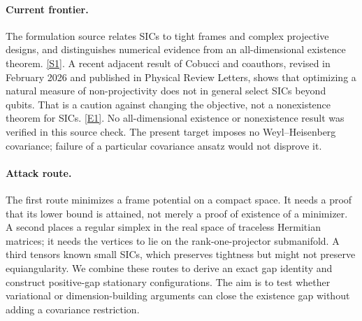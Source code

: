 \documentclass[11pt,a4paper]{article}
\newcommand{\sref}[2]{\hyperlink{source:#1:#2}{[S#2]}}
\newcommand{\eref}[2]{\hyperlink{extra:#1:#2}{[E#2]}}
\numberwithin{equation}{section}
\begin{document}
\paragraph{Current frontier.}
The formulation source relates SICs to tight frames and complex
projective designs, and distinguishes numerical evidence from an
all-dimensional existence theorem. \sref{1305}{1}.
A recent adjacent result of Cobucci and coauthors, revised in February
2026 and published in Physical Review Letters, shows that optimizing a
natural measure of non-projectivity does not in general select SICs
beyond qubits. That is a caution against changing the objective, not a
nonexistence theorem for SICs. \eref{1305}{1}.
No all-dimensional existence or nonexistence result was verified in this
source check. The present target imposes no Weyl--Heisenberg covariance;
failure of a particular covariance ansatz would not disprove it.

\paragraph{Attack route.}
The first route minimizes a frame potential on a compact space. It needs
a proof that its lower bound is attained, not merely a proof of existence
of a minimizer. A second places a regular simplex in the real space of
traceless Hermitian matrices; it needs the vertices to lie on the
rank-one-projector submanifold. A third tensors known small SICs, which
preserves tightness but might not preserve equiangularity. We combine
these routes to derive an exact gap identity and construct positive-gap
stationary configurations. The aim is to test whether variational or
dimension-building arguments can close the existence gap without adding
a covariance restriction.
\end{document}
